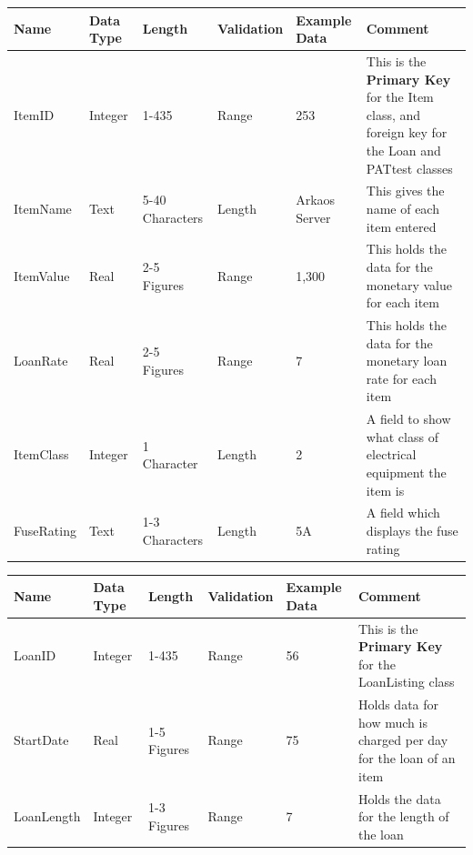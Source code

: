 \begin{landscape}
    \begin{center}
        \begin{tabular}{|p{3cm}|p{2cm}|p{3cm}|p{2cm}|p{2cm}|p{5cm}|}
            \hline
            \textbf{Name} & \textbf{Data Type} & \textbf{Length} & \textbf{Validation} & \textbf{Example Data} & \textbf{Comment} \\ \hline
            ItemID           & Integer & 1-435           & Range        & 253           & This is the \textbf{Primary Key} for the Item class, and foreign key for the 
                                                                                          Loan and PATtest classes \\ \hline
            ItemName         & Text    & 5-40 Characters & Length       & Arkaos Server & This gives the name of each item entered \\ \hline
            ItemValue        & Real    & 2-5 Figures     & Range        & 1,300         & This holds the data for the monetary value for each item \\ \hline
            LoanRate         & Real    & 2-5 Figures     & Range        & 7             & This holds the data for the monetary loan rate for each item \\ \hline
            ItemClass        & Integer & 1 Character     & Length       & 2             & A field to show what class of electrical equipment the item is \\ \hline
            FuseRating       & Text    & 1-3 Characters  & Length       & 5A            & A field which displays the fuse rating \\ \hline
            \end{tabular}
    \end{center}
\end{landscape}


\begin{landscape}
    \begin{center}
        \begin{tabular}{|p{3cm}|p{2cm}|p{3cm}|p{2cm}|p{2cm}|p{5cm}|}
            \hline
            \textbf{Name} & \textbf{Data Type} & \textbf{Length} & \textbf{Validation} & \textbf{Example Data} & \textbf{Comment} \\ \hline
            LoanID          & Integer & 1-435        & Range & 56  & This is the \textbf{Primary Key} for the LoanListing class \\ \hline
            StartDate       & Real    & 1-5 Figures  & Range & 75  & Holds data for how much is charged per day for the loan of an item \\ \hline
            LoanLength      & Integer & 1-3 Figures  & Range & 7   & Holds the data for the length of the loan \\ \hline
        \end{tabular}
    \end{center}
\end{landscape}


